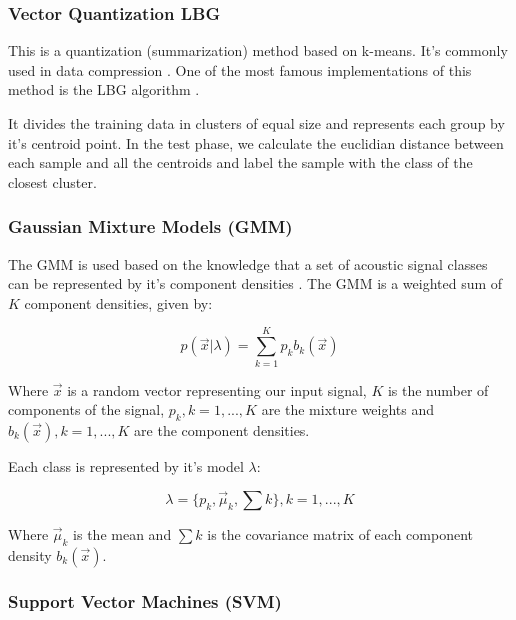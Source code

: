 \documentclass[12pt]{article}
\begin{document}
\subsubsection{Vector Quantization LBG} \label{class:qvlbg}

This is a quantization (summarization) method based on k-means. It's commonly used in data compression \cite{kekre2008speech}. One of the most famous implementations of this method is the LBG algorithm \cite{linde1980algorithm}. 

It divides the training data in clusters of equal size and represents each group by it's centroid point. In the test phase, we calculate the euclidian distance between each sample and all the centroids and label the sample with the class of the closest cluster.

\subsubsection{Gaussian Mixture Models (GMM)} \label{class:gmm}


The GMM is used based on the knowledge that a set of acoustic signal classes can be represented by it's component densities \cite{reynolds1995robust}. The GMM is a weighted sum of $K$ component densities, given by:

\begin{equation}
	p(\vec{x}|\lambda) = \sum_{k=1}^{K} p_kb_k(\vec{x})
	\label{eq:gmm}
\end{equation}

Where $\vec{x}$ is a random vector representing our input signal, $K$ is the number of components of the signal, $p_k, k = 1,...,K$ are the mixture weights and $b_k(\vec{x}), k = 1,...,K$ are the component densities.

Each class is represented by it's model $\lambda$:

\begin{equation}
	\lambda = \{ p_k, \vec{\mu}_k, \sum k \}, k = 1,...,K
	\label{eq:lambda}
\end{equation}

Where $\vec{\mu}_k$ is the mean and $\sum k$ is the covariance matrix of each component density $b_k(\vec{x})$.



\subsubsection{Support Vector Machines (SVM)} \label{class:svm}
\end{document}
